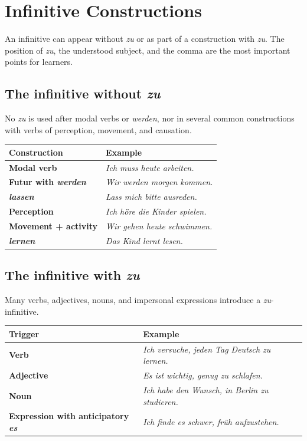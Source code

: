 \chapter{Infinitive Constructions}

An infinitive can appear without \textit{zu} or as part of a construction with
\textit{zu}. The position of \textit{zu}, the understood subject, and the
comma are the most important points for learners.

\section{The infinitive without \textit{zu}}

No \textit{zu} is used after modal verbs or \textit{werden}, nor in several
common constructions with verbs of perception, movement, and causation.

\begin{center}
\small
{}
\begin{tabularx}{\textwidth}{@{}>{\bfseries}l X@{}}
\toprule
Construction & Example \\
\midrule
Modal verb & \textit{Ich muss heute arbeiten.} \\
Futur with \textit{werden} & \textit{Wir werden morgen kommen.} \\
\textit{lassen} & \textit{Lass mich bitte ausreden.} \\
Perception & \textit{Ich höre die Kinder spielen.} \\
Movement + activity & \textit{Wir gehen heute schwimmen.} \\
\textit{lernen} & \textit{Das Kind lernt lesen.} \\
\bottomrule
\end{tabularx}
\end{center}

\section{The infinitive with \textit{zu}}

Many verbs, adjectives, nouns, and impersonal expressions introduce a
\textit{zu}-infinitive.

\begin{center}
\small
{}
\begin{tabularx}{\textwidth}{@{}>{\bfseries}l X@{}}
\toprule
Trigger & Example \\
\midrule
Verb & \textit{Ich versuche, jeden Tag Deutsch zu lernen.} \\
Adjective & \textit{Es ist wichtig, genug zu schlafen.} \\
Noun & \textit{Ich habe den Wunsch, in Berlin zu studieren.} \\
Expression with anticipatory \textit{es}
  & \textit{Ich finde es schwer, früh aufzustehen.} \\
\bottomrule
\end{tabularx}
\end{center}

